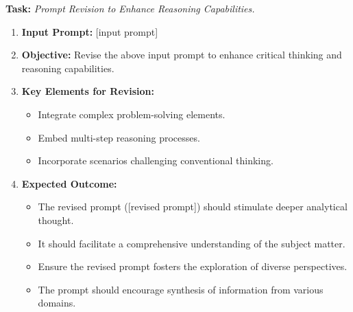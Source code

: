 \begin{tcolorbox}[width=0.95\textwidth,colback=gray!2!white,colframe=gray!50!blue]
    \begin{minipage}{\textwidth}
        \textbf{Task:} \textit{Prompt Revision to Enhance Reasoning Capabilities.}
        \begin{enumerate}
            \item \textbf{Input Prompt:} [input prompt]
            \item \textbf{Objective:} Revise the above input prompt to enhance critical thinking and reasoning capabilities.
            \item \textbf{Key Elements for Revision:}
                \begin{itemize}
                    \item Integrate complex problem-solving elements.
                    \item Embed multi-step reasoning processes.
                    \item Incorporate scenarios challenging conventional thinking.
                \end{itemize}
            \item \textbf{Expected Outcome:}
                \begin{itemize}
                    \item The revised prompt ([revised prompt]) should stimulate deeper analytical thought.
                    \item It should facilitate a comprehensive understanding of the subject matter.
                    \item Ensure the revised prompt fosters the exploration of diverse perspectives.
                    \item The prompt should encourage synthesis of information from various domains.
                \end{itemize}
        \end{enumerate}
\end{minipage}
\end{tcolorbox}
